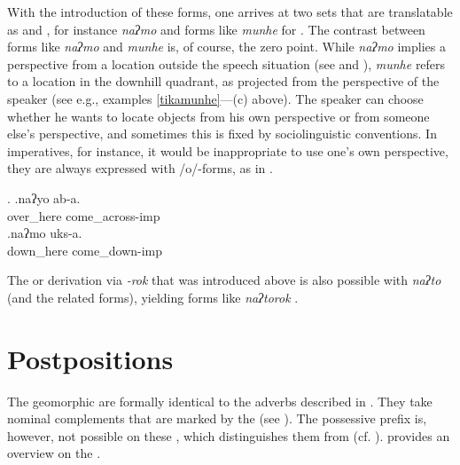 With the introduction of these forms, one arrives at two sets that are translatable as  and , for instance \emph{naʔmo}  and forms like  \emph{munhe} for . The  contrast between forms like  \emph{naʔmo}  and  \emph{munhe} is, of course, the zero point. While \emph{naʔmo} implies a perspective from a location outside the speech situation (see \Last and \Next), \emph{munhe} refers to a location in the downhill quadrant, as projected from the perspective of the speaker (see e.g., examples \ref{tikamunhe}—(c) above).  The speaker can choose whether he wants to locate objects from his own perspective or from someone else's perspective, and sometimes this is fixed by sociolinguistic conventions. In imperatives, for instance, it would be inappropriate to use one's own perspective, they are always expressed with /o/-forms, as in \Next. 

\ex. \ag.naʔyo ab-a.\\
over\_here come\_across{\sc -imp}\\
\bg.naʔmo uks-a.\\
down\_here come\_down{\sc -imp}\\


The  or  derivation via \emph{-rok} that was introduced above is also possible with \emph{naʔto} (and the related forms), yielding forms like \emph{naʔtorok} .



\section{Postpositions}\label{geomorph-postp}

The geomorphic  are formally identical to the adverbs described in . They take nominal complements that are marked by the   (see ). The possessive prefix is, however, not possible on these , which distinguishes  them from  (cf. ).  provides an overview on the .

